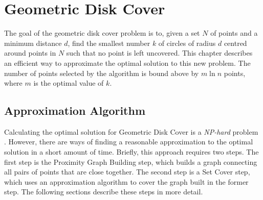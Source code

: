 \cleardoublepage
\chapter{Geometric Disk Cover}
\label{chap:approx}

The goal of the geometric disk cover problem is to, given a set $N$ of points and a minimum distance $d$, find the smallest number $k$ of circles of radius $d$ centred around points in $N$ such that no point is left uncovered. This chapter describes an efficient way to approximate the optimal solution to this new problem. The number of points selected by the algorithm is bound above by $m \ln {n}$ points, where $m$ is the optimal value of $k$.

\section{Approximation Algorithm}
Calculating the optimal solution for Geometric Disk Cover is a \emph{NP-hard} problem \cite{gdccomplex}. However, there are ways of finding a reasonable approximation to the optimal solution in a short amount of time. Briefly, this approach requires two steps. The first step is the Proximity Graph Building step, which builds a graph connecting all pairs of points that are close together. The second step is a Set Cover step, which uses an approximation algorithm to cover the graph built in the former step. The following sections describe these steps in more detail.

